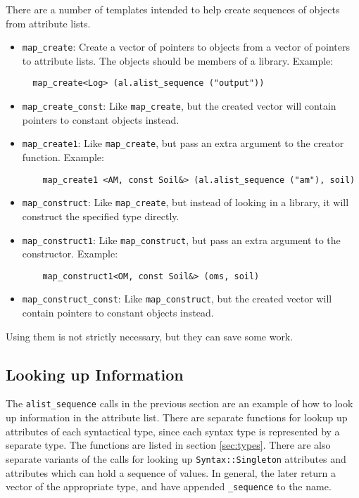\documentclass{article}
\newcommand{\cplusplus}%
{{\leavevmode{\rm{\hbox{C\hskip -0.1ex\raise 0.5ex\hbox{\tiny ++}}}}}}
\newcommand{\code}[1]{\texttt{#1}}
\begin{document}
There are a number of templates intended to help create sequences of
objects from attribute lists.
\begin{itemize}
\item \code{map\_create}: Create a vector of pointers to objects from
  a vector of pointers to attribute lists.  The objects should be
  members of a library.  Example:
\begin{verbatim}
  map_create<Log> (al.alist_sequence ("output"))
\end{verbatim}

\item \code{map\_create\_const}: Like \code{map\_create}, but the
  created vector will contain pointers to constant objects instead.

\item \code{map\_create1}: Like \code{map\_create}, but pass an extra
  argument to the creator function.  Example:
\begin{verbatim}
    map_create1 <AM, const Soil&> (al.alist_sequence ("am"), soil)
\end{verbatim}

\item \code{map\_construct}: Like \code{map\_create}, but instead of
  looking in a library, it will construct the specified type
  directly.   

\item \code{map\_construct1}:  Like \code{map\_construct}, but pass an
  extra argument to the constructor.  Example:
\begin{verbatim}
    map_construct1<OM, const Soil&> (oms, soil)
\end{verbatim}

\item \code{map\_construct\_const}: Like \code{map\_construct}, but
  the created vector will contain pointers to constant objects
  instead.

\end{itemize}
Using them is not strictly necessary, but they can save some work.

\subsection{Looking up Information}

The \code{alist\_sequence} calls in the previous section are an
example of how to look up information in the attribute list.  There
are separate functions for lookup up attributes of each syntactical
type, since each syntax type is represented by a separate \cplusplus{}
type.  The functions are listed in section \ref{sec:types}.  There are
also separate variants of the calls for looking up
\code{Syntax::Singleton} attributes and attributes which can hold a
sequence of values.  In general, the later return a vector of the
appropriate \cplusplus{} type, and have appended \code{\_sequence} to
the name.
\end{document}
